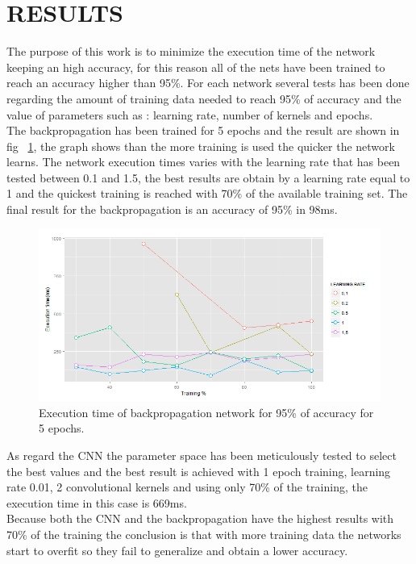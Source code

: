 \documentclass[a4paper, 10pt, conference]{ieeeconf}      %
\begin{document}
\section{RESULTS}\label{sec:results}
The purpose of this work is to minimize the execution time of the network keeping an high accuracy, for this reason all of the nets have been trained to reach an accuracy higher than 95\%. For each network several tests has been done regarding the amount of training data needed to reach 95\% of accuracy and the value of parameters such as : learning rate, number of kernels and epochs.\\
The backpropagation has been trained for 5 epochs and the result are shown in fig ~\ref{bpPlot}, the graph shows than the more training is used the quicker the network learns. The network execution times varies with the learning rate that has been tested between 0.1 and 1.5, the best results are obtain by a learning rate equal to 1 and the quickest training is reached with 70\% of the available training set. The final result for the backpropagation is an accuracy of 95\% in 98ms.\\
\begin{figure}[thpb]
	
	\includegraphics[scale=0.3]{plotBP.png}
	\caption{Execution time of backpropagation network for 95\% of accuracy for 5 epochs.}
	\label{bpPlot}
\end{figure}
As regard the CNN the parameter space has been meticulously tested to select the best values and the best result is achieved with 1 epoch training, learning rate 0.01, 2 convolutional kernels and using only 70\% of the training, the execution time in this case is 669ms.\\ Because both the CNN and the backpropagation have the highest results with 70\% of the training the conclusion is that with more training data the networks start to overfit so they fail to generalize and obtain a lower accuracy.\\
\end{document}
